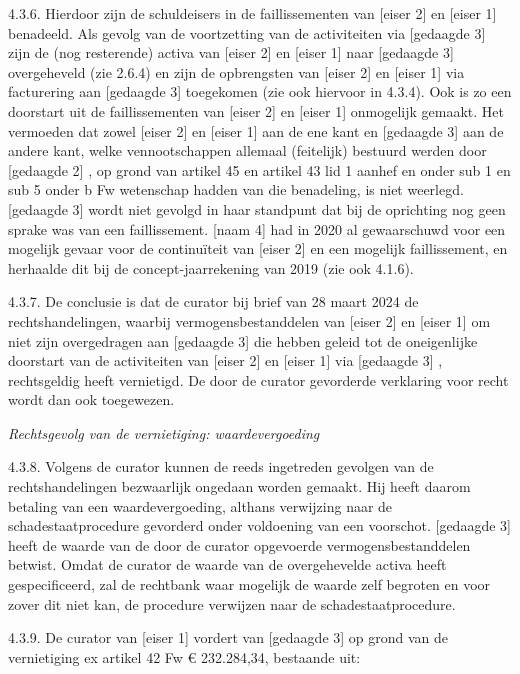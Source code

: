 \documentclass[
  dutch,
  a4paper,
]{article}
\begin{document}
4.3.6. Hierdoor zijn de schuldeisers in de faillissementen van {[}eiser 2{]} en {[}eiser 1{]} benadeeld. Als gevolg van de voortzetting van de activiteiten via {[}gedaagde 3{]} zijn de (nog resterende) activa van {[}eiser 2{]} en {[}eiser 1{]} naar {[}gedaagde 3{]} overgeheveld (zie 2.6.4) en zijn de opbrengsten van {[}eiser 2{]} en {[}eiser 1{]} via facturering aan {[}gedaagde 3{]} toegekomen (zie ook hiervoor in 4.3.4). Ook is zo een doorstart uit de faillissementen van {[}eiser 2{]} en {[}eiser 1{]} onmogelijk gemaakt. Het vermoeden dat zowel {[}eiser 2{]} en {[}eiser 1{]} aan de ene kant en {[}gedaagde 3{]} aan de andere kant, welke vennootschappen allemaal (feitelijk) bestuurd werden door {[}gedaagde 2{]} , op grond van artikel 45 en artikel 43 lid 1 aanhef en onder sub 1 en sub 5 onder b Fw wetenschap hadden van die benadeling, is niet weerlegd. {[}gedaagde 3{]} wordt niet gevolgd in haar standpunt dat bij de oprichting nog geen sprake was van een faillissement. {[}naam 4{]} had in 2020 al gewaarschuwd voor een mogelijk gevaar voor de continuïteit van {[}eiser 2{]} en een mogelijk faillissement, en herhaalde dit bij de concept-jaarrekening van 2019 (zie ook 4.1.6).

4.3.7. De conclusie is dat de curator bij brief van 28 maart 2024 de rechtshandelingen, waarbij vermogensbestanddelen van {[}eiser 2{]} en {[}eiser 1{]} om niet zijn overgedragen aan {[}gedaagde 3{]} die hebben geleid tot de oneigenlijke doorstart van de activiteiten van {[}eiser 2{]} en {[}eiser 1{]} via {[}gedaagde 3{]} , rechtsgeldig heeft vernietigd. De door de curator gevorderde verklaring voor recht wordt dan ook toegewezen.

\emph{Rechtsgevolg van de vernietiging: waardevergoeding}

4.3.8. Volgens de curator kunnen de reeds ingetreden gevolgen van de rechtshandelingen bezwaarlijk ongedaan worden gemaakt. Hij heeft daarom betaling van een waardevergoeding, althans verwijzing naar de schadestaatprocedure gevorderd onder voldoening van een voorschot. {[}gedaagde 3{]} heeft de waarde van de door de curator opgevoerde vermogensbestanddelen betwist. Omdat de curator de waarde van de overgehevelde activa heeft gespecificeerd, zal de rechtbank waar mogelijk de waarde zelf begroten en voor zover dit niet kan, de procedure verwijzen naar de schadestaatprocedure.

4.3.9. De curator van {[}eiser 1{]} vordert van {[}gedaagde 3{]} op grond van de vernietiging ex artikel 42 Fw € 232.284,34, bestaande uit:
\end{document}
